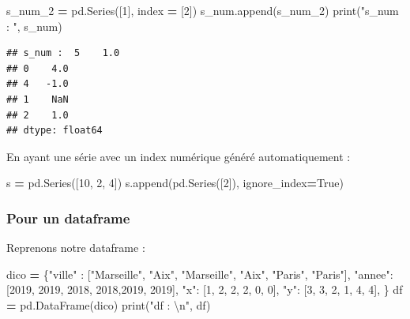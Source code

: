 \documentclass[12pt,]{book}
\newenvironment{Shaded}{\begin{snugshade}}{\end{snugshade}}
\newcommand{\DecValTok}[1]{\textcolor[rgb]{0.00,0.00,0.81}{#1}}
\newcommand{\CharTok}[1]{\textcolor[rgb]{0.31,0.60,0.02}{#1}}
\newcommand{\StringTok}[1]{\textcolor[rgb]{0.31,0.60,0.02}{#1}}
\newcommand{\VariableTok}[1]{\textcolor[rgb]{0.00,0.00,0.00}{#1}}
\newcommand{\OperatorTok}[1]{\textcolor[rgb]{0.81,0.36,0.00}{\textbf{#1}}}
\newcommand{\BuiltInTok}[1]{#1}
\newcommand{\NormalTok}[1]{#1}
\numberwithin{equation}{section}
\numberwithin{countremarque}{section}
\begin{document}
\begin{Shaded}
\begin{Highlighting}[]
\NormalTok{s_num_2 }\OperatorTok{=}\NormalTok{ pd.Series([}\DecValTok{1}\NormalTok{], index }\OperatorTok{=}\NormalTok{ [}\DecValTok{2}\NormalTok{])}
\NormalTok{s_num.append(s_num_2)}
\BuiltInTok{print}\NormalTok{(}\StringTok{"s_num : "}\NormalTok{, s_num)}
\end{Highlighting}
\end{Shaded}

\begin{lstlisting}
## s_num :  5    1.0
## 0    4.0
## 4   -1.0
## 1    NaN
## 2    1.0
## dtype: float64
\end{lstlisting}

En ayant une série avec un index numérique généré automatiquement :

\begin{Shaded}
\begin{Highlighting}[]
\NormalTok{s }\OperatorTok{=}\NormalTok{ pd.Series([}\DecValTok{10}\NormalTok{, }\DecValTok{2}\NormalTok{, }\DecValTok{4}\NormalTok{])}
\NormalTok{s.append(pd.Series([}\DecValTok{2}\NormalTok{]), ignore_index}\OperatorTok{=}\VariableTok{True}\NormalTok{)}
\end{Highlighting}
\end{Shaded}

\subsubsection{Pour un dataframe}\label{pour-un-dataframe-1}

Reprenons notre dataframe :

\begin{Shaded}
\begin{Highlighting}[]
\NormalTok{dico }\OperatorTok{=}\NormalTok{ \{}\StringTok{"ville"}\NormalTok{ : [}\StringTok{"Marseille"}\NormalTok{, }\StringTok{"Aix"}\NormalTok{,}
                   \StringTok{"Marseille"}\NormalTok{, }\StringTok{"Aix"}\NormalTok{, }\StringTok{"Paris"}\NormalTok{, }\StringTok{"Paris"}\NormalTok{],}
        \StringTok{"annee"}\NormalTok{: [}\DecValTok{2019}\NormalTok{, }\DecValTok{2019}\NormalTok{, }\DecValTok{2018}\NormalTok{, }\DecValTok{2018}\NormalTok{,}\DecValTok{2019}\NormalTok{, }\DecValTok{2019}\NormalTok{],}
        \StringTok{"x"}\NormalTok{: [}\DecValTok{1}\NormalTok{, }\DecValTok{2}\NormalTok{, }\DecValTok{2}\NormalTok{, }\DecValTok{2}\NormalTok{, }\DecValTok{0}\NormalTok{, }\DecValTok{0}\NormalTok{],}
        \StringTok{"y"}\NormalTok{: [}\DecValTok{3}\NormalTok{, }\DecValTok{3}\NormalTok{, }\DecValTok{2}\NormalTok{, }\DecValTok{1}\NormalTok{, }\DecValTok{4}\NormalTok{, }\DecValTok{4}\NormalTok{],}
\NormalTok{       \} }
\NormalTok{df }\OperatorTok{=}\NormalTok{ pd.DataFrame(dico)}
\BuiltInTok{print}\NormalTok{(}\StringTok{"df : }\CharTok{\textbackslash{}n}\StringTok{"}\NormalTok{, df)}
\end{Highlighting}
\end{Shaded}
\end{document}
